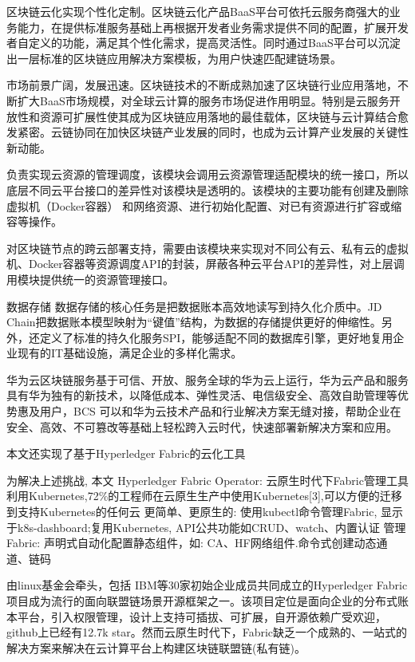 区块链云化实现个性化定制。区块链云化产品BaaS平台可依托云服务商强大的业务能力，在提供标准服务基础上再根据开发者业务需求提供不同的配置，扩展开发者自定义的功能，满足其个性化需求，提高灵活性。同时通过BaaS平台可以沉淀出一层标准的区块链应用解决方案模板，为用户快速匹配建链场景。

市场前景广阔，发展迅速。区块链技术的不断成熟加速了区块链行业应用落地，不断扩大BaaS市场规模，对全球云计算的服务市场促进作用明显。特别是云服务开放性和资源可扩展性使其成为区块链应用落地的最佳载体，区块链与云计算结合愈发紧密。云链协同在加快区块链产业发展的同时，也成为云计算产业发展的关键性新动能。

负责实现云资源的管理调度，该模块会调用云资源管理适配模块的统一接口，所以底层不同云平台接口的差异性对该模块是透明的。该模块的主要功能有创建及删除虚拟机（Docker容器） 和网络资源、进行初始化配置、对已有资源进行扩容或缩容等操作。

对区块链节点的跨云部署支持，需要由该模块来实现对不同公有云、私有云的虚拟机、Docker容器等资源调度API的封装，屏蔽各种云平台API的差异性，对上层调用模块提供统一的资源管理接口。

数据存储
数据存储的核心任务是把数据账本高效地读写到持久化介质中。JD Chain把数据账本模型映射为“键值”结构，为数据的存储提供更好的伸缩性。另外，还定义了标准的持久化服务SPI，能够适配不同的数据库引擎，更好地复用企业现有的IT基础设施，满足企业的多样化需求。

华为云区块链服务基于可信、开放、服务全球的华为云上运行，华为云产品和服务具有华为独有的新技术，以降低成本、弹性灵活、电信级安全、高效自助管理等优势惠及用户，BCS 可以和华为云技术产品和行业解决方案无缝对接，帮助企业在安全、高效、不可篡改等基础上轻松跨入云时代，快速部署新解决方案和应用。

本文还实现了基于Hyperledger Fabric的云化工具

为解决上述挑战, 本文
Hyperledger Fabric Operator: 云原生时代下Fabric管理工具
利用Kubernetes,72\%的工程师在云原生生产中使用Kubernetes[3],可以方便的迁移到支持Kubernetes的任何云 
更简单、更原生的: 使用kubectl命令管理Fabric, 显示于k8s-dashboard;复用Kubernetes, API公共功能如CRUD、watch、内置认证
管理Fabric: 声明式自动化配置静态组件，如: CA、HF网络组件.命令式创建动态通道、链码

由linux基金会牵头，包括 IBM等30家初始企业成员共同成立的Hyperledger Fabric项目成为流行的面向联盟链场景开源框架之一。该项目定位是面向企业的分布式账本平台，引入权限管理，设计上支持可插拔、可扩展，自开源依赖广受欢迎，github上已经有12.7k star。然而云原生时代下，Fabric缺乏一个成熟的、一站式的解决方案来解决在云计算平台上构建区块链联盟链(私有链)。

